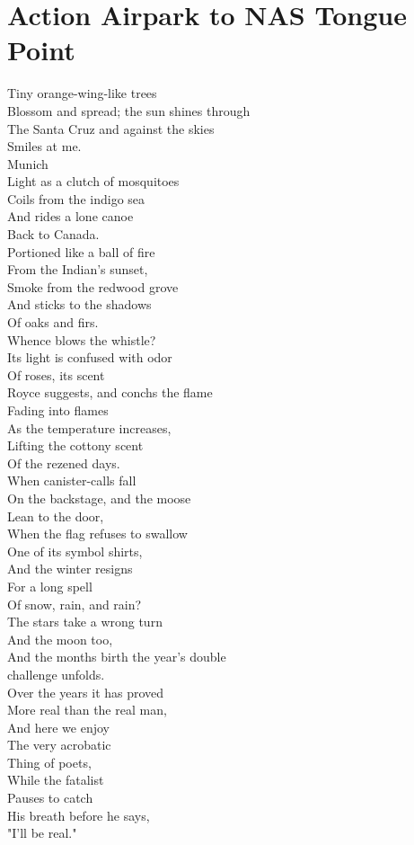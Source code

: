 \documentclass[smalldemyvopaper,11pt,twoside,onecolumn,openright,extrafontsizes]{memoir}
\begin{document}
\chapter{Action Airpark to NAS Tongue Point}
Tiny orange-wing-like trees
\\Blossom and spread; the sun shines through
\\The Santa Cruz and against the skies
\\Smiles at me.
\\Munich
\\Light as a clutch of mosquitoes
\\Coils from the indigo sea
\\And rides a lone canoe
\\Back to Canada.
\\Portioned like a ball of fire
\\From the Indian's sunset,
\\Smoke from the redwood grove
\\And sticks to the shadows
\\Of oaks and firs.
\\Whence blows the whistle?
\\Its light is confused with odor
\\Of roses, its scent
\\Royce suggests, and conchs the flame
\\Fading into flames
\\As the temperature increases,
\\Lifting the cottony scent
\\Of the rezened days.
\\When canister-calls fall
\\On the backstage, and the moose
\\Lean to the door,
\\When the flag refuses to swallow
\\One of its symbol shirts,
\\And the winter resigns
\\For a long spell
\\Of snow, rain, and rain?
\\The stars take a wrong turn
\\And the moon too,
\\And the months birth the year's double
\\challenge unfolds.
\\Over the years it has proved
\\More real than the real man,
\\And here we enjoy
\\The very acrobatic
\\Thing of poets,
\\While the fatalist
\\Pauses to catch
\\His breath before he says,
\\"I'll be real."
\end{document}
